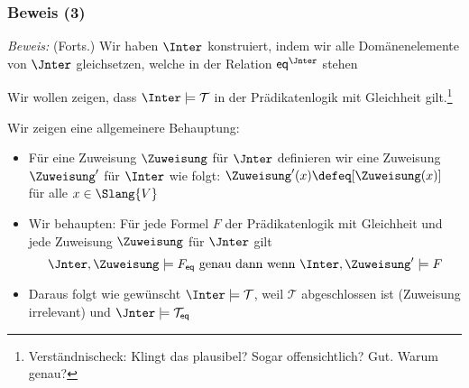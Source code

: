 \documentclass[aspectratio=1610,onlymath]{beamer}
\begin{document}
\begin{frame}[t]\frametitle{Beweis (3)}

% 

\emph{Beweis:} {\footnotesize(Forts.)}
Wir haben $\Inter$ konstruiert, indem wir alle Domänenelemente von $\Jnter$
gleichsetzen, welche in der Relation $\eqpred^\Jnter$ stehen
\medskip

Wir wollen zeigen, dass $\Inter\models\mathcal{T}$ in der Prädikatenlogik mit Gleichheit gilt.\footnote{\tiny Verständnischeck: Klingt das plausibel? Sogar offensichtlich? Gut. Warum genau?}\pause\medskip

\alert{Wir zeigen eine allgemeinere Behauptung:}
\begin{itemize}
\item Für eine Zuweisung $\Zuweisung$ für $\Jnter$ definieren wir eine Zuweisung $\Zuweisung'$ für $\Inter$ wie folgt: $\Zuweisung'(x)\defeq[\Zuweisung(x)]$ für alle $x\in\Slang{V}$
\item Wir behaupten: Für jede Formel $F$ der Prädikatenlogik mit Gleichheit und jede Zuweisung $\Zuweisung$ für $\Jnter$ gilt
\[ \Jnter,\Zuweisung\models F_{\eqpred} \text{ genau dann wenn } \Inter,\Zuweisung'\models F \]
\item Daraus folgt wie gewünscht $\Inter\models\mathcal{T}$, weil $\mathcal{T}$ abgeschlossen ist (Zuweisung irrelevant) und $\Jnter\models\mathcal{T}_{\eqpred}$
% 
\end{itemize}


\end{frame}
\end{document}
